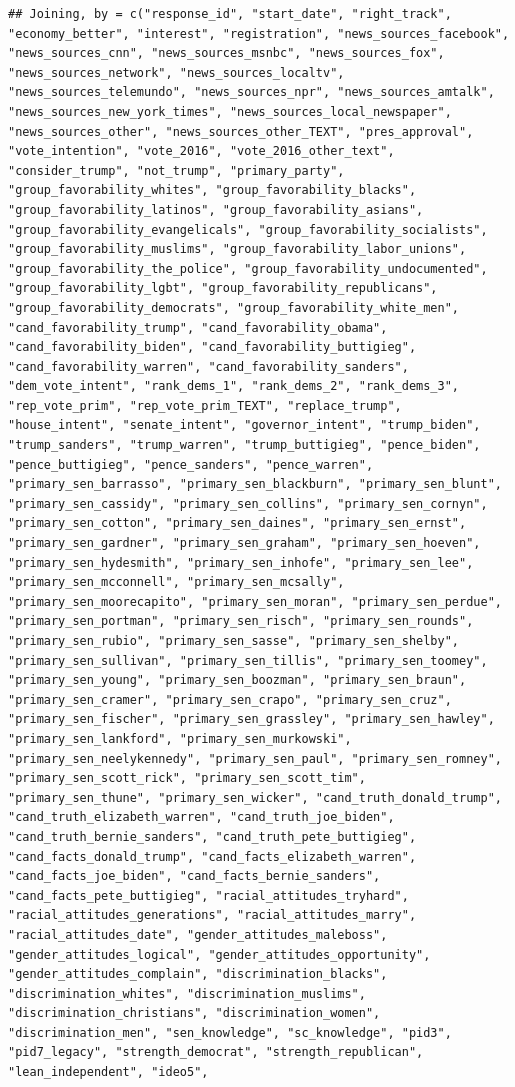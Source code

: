 \documentclass[
]{article}
\begin{document}
\begin{verbatim}
## Joining, by = c("response_id", "start_date", "right_track", "economy_better", "interest", "registration", "news_sources_facebook", "news_sources_cnn", "news_sources_msnbc", "news_sources_fox", "news_sources_network", "news_sources_localtv", "news_sources_telemundo", "news_sources_npr", "news_sources_amtalk", "news_sources_new_york_times", "news_sources_local_newspaper", "news_sources_other", "news_sources_other_TEXT", "pres_approval", "vote_intention", "vote_2016", "vote_2016_other_text", "consider_trump", "not_trump", "primary_party", "group_favorability_whites", "group_favorability_blacks", "group_favorability_latinos", "group_favorability_asians", "group_favorability_evangelicals", "group_favorability_socialists", "group_favorability_muslims", "group_favorability_labor_unions", "group_favorability_the_police", "group_favorability_undocumented", "group_favorability_lgbt", "group_favorability_republicans", "group_favorability_democrats", "group_favorability_white_men", "cand_favorability_trump", "cand_favorability_obama", "cand_favorability_biden", "cand_favorability_buttigieg", "cand_favorability_warren", "cand_favorability_sanders", "dem_vote_intent", "rank_dems_1", "rank_dems_2", "rank_dems_3", "rep_vote_prim", "rep_vote_prim_TEXT", "replace_trump", "house_intent", "senate_intent", "governor_intent", "trump_biden", "trump_sanders", "trump_warren", "trump_buttigieg", "pence_biden", "pence_buttigieg", "pence_sanders", "pence_warren", "primary_sen_barrasso", "primary_sen_blackburn", "primary_sen_blunt", "primary_sen_cassidy", "primary_sen_collins", "primary_sen_cornyn", "primary_sen_cotton", "primary_sen_daines", "primary_sen_ernst", "primary_sen_gardner", "primary_sen_graham", "primary_sen_hoeven", "primary_sen_hydesmith", "primary_sen_inhofe", "primary_sen_lee", "primary_sen_mcconnell", "primary_sen_mcsally", "primary_sen_moorecapito", "primary_sen_moran", "primary_sen_perdue", "primary_sen_portman", "primary_sen_risch", "primary_sen_rounds", "primary_sen_rubio", "primary_sen_sasse", "primary_sen_shelby", "primary_sen_sullivan", "primary_sen_tillis", "primary_sen_toomey", "primary_sen_young", "primary_sen_boozman", "primary_sen_braun", "primary_sen_cramer", "primary_sen_crapo", "primary_sen_cruz", "primary_sen_fischer", "primary_sen_grassley", "primary_sen_hawley", "primary_sen_lankford", "primary_sen_murkowski", "primary_sen_neelykennedy", "primary_sen_paul", "primary_sen_romney", "primary_sen_scott_rick", "primary_sen_scott_tim", "primary_sen_thune", "primary_sen_wicker", "cand_truth_donald_trump", "cand_truth_elizabeth_warren", "cand_truth_joe_biden", "cand_truth_bernie_sanders", "cand_truth_pete_buttigieg", "cand_facts_donald_trump", "cand_facts_elizabeth_warren", "cand_facts_joe_biden", "cand_facts_bernie_sanders", "cand_facts_pete_buttigieg", "racial_attitudes_tryhard", "racial_attitudes_generations", "racial_attitudes_marry", "racial_attitudes_date", "gender_attitudes_maleboss", "gender_attitudes_logical", "gender_attitudes_opportunity", "gender_attitudes_complain", "discrimination_blacks", "discrimination_whites", "discrimination_muslims", "discrimination_christians", "discrimination_women", "discrimination_men", "sen_knowledge", "sc_knowledge", "pid3", "pid7_legacy", "strength_democrat", "strength_republican", "lean_independent", "ideo5", 
\end{verbatim}
\end{document}
